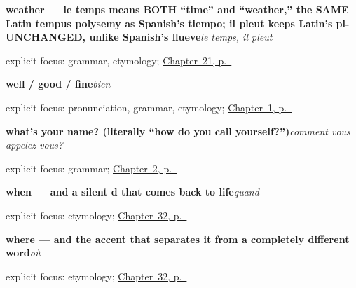 \noindent\begin{minipage}[t]{\linewidth}
\raggedright
\textbf{weather — le temps means BOTH \textquotedblleft{}time\textquotedblright{} and \textquotedblleft{}weather,\textquotedblright{} the SAME Latin tempus polysemy as Spanish's tiempo; il pleut keeps Latin's pl- UNCHANGED, unlike Spanish's llueve}\enspace\emph{le temps, il pleut}\par
\footnotesize explicit focus: grammar, etymology; \hyperref[ch:fr-weather]{Chapter~21, p.~\pageref*{ch:fr-weather}}
\end{minipage}\par\smallskip

\noindent\begin{minipage}[t]{\linewidth}
\raggedright
\textbf{well / good / fine}\enspace\emph{bien}\par
\footnotesize explicit focus: pronunciation, grammar, etymology; \hyperref[ch:greetings]{Chapter~1, p.~\pageref*{ch:greetings}}
\end{minipage}\par\smallskip

\noindent\begin{minipage}[t]{\linewidth}
\raggedright
\textbf{what's your name? (literally \textquotedblleft{}how do you call yourself?\textquotedblright{})}\enspace\emph{comment vous appelez-vous?}\par
\footnotesize explicit focus: grammar; \hyperref[ch:introductions]{Chapter~2, p.~\pageref*{ch:introductions}}
\end{minipage}\par\smallskip

\noindent\begin{minipage}[t]{\linewidth}
\raggedright
\textbf{when — and a silent d that comes back to life}\enspace\emph{quand}\par
\footnotesize explicit focus: etymology; \hyperref[ch:fr-questions]{Chapter~32, p.~\pageref*{ch:fr-questions}}
\end{minipage}\par\smallskip

\noindent\begin{minipage}[t]{\linewidth}
\raggedright
\textbf{where — and the accent that separates it from a completely different word}\enspace\emph{où}\par
\footnotesize explicit focus: etymology; \hyperref[ch:fr-questions]{Chapter~32, p.~\pageref*{ch:fr-questions}}
\end{minipage}\par\smallskip

